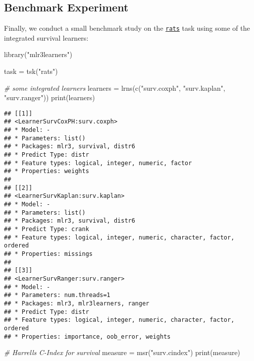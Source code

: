 \documentclass[
]{scrbook}
\newenvironment{Shaded}{\begin{snugshade}}{\end{snugshade}}
\newcommand{\CommentTok}[1]{\textcolor[rgb]{0.56,0.35,0.01}{\textit{#1}}}
\newcommand{\FunctionTok}[1]{\textcolor[rgb]{0.00,0.00,0.00}{#1}}
\newcommand{\NormalTok}[1]{#1}
\newcommand{\OtherTok}[1]{\textcolor[rgb]{0.56,0.35,0.01}{#1}}
\newcommand{\StringTok}[1]{\textcolor[rgb]{0.31,0.60,0.02}{#1}}
\renewenvironment{Shaded} {\begin{snugshade}\small} {\end{snugshade}}
\begin{document}
\hypertarget{benchmark-experiment}{%
\subsection{Benchmark Experiment}\label{benchmark-experiment}}

Finally, we conduct a small benchmark study on the \href{https://mlr3proba.mlr-org.com/reference/mlr_tasks_rats.html}{\texttt{rats}} task using some of the integrated survival learners:

\begin{Shaded}
\begin{Highlighting}[]
\FunctionTok{library}\NormalTok{(}\StringTok{"mlr3learners"}\NormalTok{)}

\NormalTok{task }\OtherTok{=} \FunctionTok{tsk}\NormalTok{(}\StringTok{"rats"}\NormalTok{)}

\CommentTok{\# some integrated learners}
\NormalTok{learners }\OtherTok{=} \FunctionTok{lrns}\NormalTok{(}\FunctionTok{c}\NormalTok{(}\StringTok{"surv.coxph"}\NormalTok{, }\StringTok{"surv.kaplan"}\NormalTok{, }\StringTok{"surv.ranger"}\NormalTok{))}
\FunctionTok{print}\NormalTok{(learners)}
\end{Highlighting}
\end{Shaded}

\begin{verbatim}
## [[1]]
## <LearnerSurvCoxPH:surv.coxph>
## * Model: -
## * Parameters: list()
## * Packages: mlr3, survival, distr6
## * Predict Type: distr
## * Feature types: logical, integer, numeric, factor
## * Properties: weights
## 
## [[2]]
## <LearnerSurvKaplan:surv.kaplan>
## * Model: -
## * Parameters: list()
## * Packages: mlr3, survival, distr6
## * Predict Type: crank
## * Feature types: logical, integer, numeric, character, factor, ordered
## * Properties: missings
## 
## [[3]]
## <LearnerSurvRanger:surv.ranger>
## * Model: -
## * Parameters: num.threads=1
## * Packages: mlr3, mlr3learners, ranger
## * Predict Type: distr
## * Feature types: logical, integer, numeric, character, factor, ordered
## * Properties: importance, oob_error, weights
\end{verbatim}

\begin{Shaded}
\begin{Highlighting}[]
\CommentTok{\# Harrell\textquotesingle{}s C{-}Index for survival}
\NormalTok{measure }\OtherTok{=} \FunctionTok{msr}\NormalTok{(}\StringTok{"surv.cindex"}\NormalTok{)}
\FunctionTok{print}\NormalTok{(measure)}
\end{Highlighting}
\end{Shaded}
\end{document}

